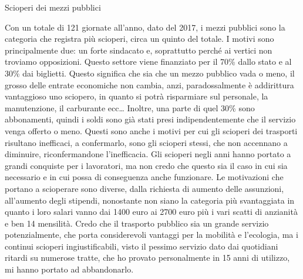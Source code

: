 \documentclass[12pt]{book} %
\begin{document}
\begin{mdframed}[linewidth=1pt]
Scioperi dei mezzi pubblici

Con un totale di 121 giornate all'anno, dato del 2017, i mezzi pubblici sono la categoria che
registra più scioperi, circa un quinto del totale. I motivi sono principalmente due: un forte sindacato e, soprattutto
perché ai vertici non troviamo opposizioni. Questo settore viene finanziato per il 70\% dallo stato e al 30\% dai
biglietti. Questo significa che sia che un mezzo pubblico vada o meno, il grosso delle entrate economiche non cambia,
anzi, paradossalmente è addirittura vantaggioso uno sciopero, in quanto si potrà risparmiare sul personale, la
manutenzione, il carburante ecc… Inoltre, una parte di quel 30\% sono abbonamenti, quindi i soldi sono già stati
presi indipendentemente che il servizio venga offerto o
meno. Questi
sono anche i motivi per cui gli scioperi dei trasporti risultano inefficaci, a confermarlo, sono gli scioperi stessi,
che non accennano a diminuire, riconfermandone l'inefficacia. Gli scioperi negli anni hanno
portato a grandi conquiste per i lavoratori, ma non credo che questo sia il caso in cui sia necessario e in cui possa
di conseguenza anche funzionare. Le motivazioni che portano a scioperare sono diverse, dalla richiesta di aumento delle
assunzioni, all'aumento degli stipendi, nonostante non siano la categoria più svantaggiata in
quanto i loro salari vanno dai 1400 euro ai 2700 euro più i vari scatti di anzianità
e ben 14 mensilità. Credo che il trasporto pubblico sia
un grande servizio potenzialmente, che porta considerevoli vantaggi per la mobilità e l'ecologia,
ma i continui scioperi ingiustificabili, visto il pessimo servizio dato dai quotidiani ritardi su numerose tratte, che
ho provato personalmente in 15 anni di utilizzo, mi hanno portato ad abbandonarlo.


\end{mdframed}
\end{document}
